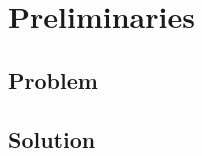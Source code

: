 \documentclass[
  11pt,
  ]{book}
\begin{document}
\chapter{Preliminaries}
\section{Problem}
\section{Solution}
\end{document}
